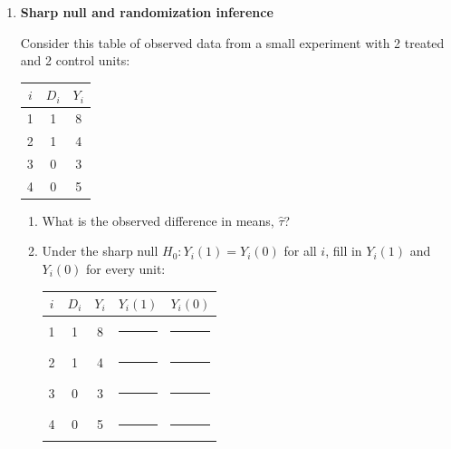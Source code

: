 \documentclass[12pt]{article}
\begin{document}
\begin{enumerate}
\begin{enumerate}[label=(\alph*)]
    \item Why does random assignment of $D_i$ eliminate this term?

    \vspace{2cm}

    \item Once the bias term is zero, the DIM equals the ATT. Why does it also equal the ATE under randomization?

    \vspace{2cm}
\end{enumerate}

\clearpage

\item \textbf{Sharp null and randomization inference}

Consider this table of observed data from a small experiment with 2 treated and 2 control units:

\begin{center}
\begin{tabular}{c c c}
$i$ & $D_i$ & $Y_i$ \\
\hline
1 & 1 & 8 \\
2 & 1 & 4 \\
3 & 0 & 3 \\
4 & 0 & 5 \\
\end{tabular}
\end{center}

\begin{enumerate}[label=(\alph*)]
    \item What is the observed difference in means, $\widehat{\tau}$?

    \vspace{0.8cm}

    \item Under the sharp null $H_0: Y_i(1) = Y_i(0)$ for all $i$, fill in $Y_i(1)$ and $Y_i(0)$ for every unit:

    \begin{center}
    {\renewcommand{\arraystretch}{1.6}
    \begin{tabular}{c c c c c}
    $i$ & $D_i$ & $Y_i$ & $Y_i(1)$ & $Y_i(0)$ \\
    \hline
    1 & 1 & 8 & \rule{1cm}{0.4pt} & \rule{1cm}{0.4pt} \\
    2 & 1 & 4 & \rule{1cm}{0.4pt} & \rule{1cm}{0.4pt} \\
    3 & 0 & 3 & \rule{1cm}{0.4pt} & \rule{1cm}{0.4pt} \\
    4 & 0 & 5 & \rule{1cm}{0.4pt} & \rule{1cm}{0.4pt} \\
    \end{tabular}}
    \end{center}


\end{enumerate}
\end{enumerate}
\end{document}
